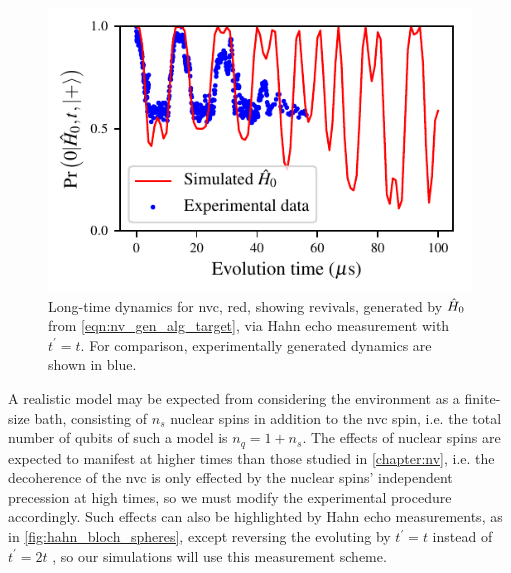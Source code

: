 \begin{figure}
    \begin{center}
        \includegraphics{experimental_study/figures/nv_revival_raw_data.pdf}
    \end{center}
    \caption[Long-time dynamics for nitrogen-vacancy centres]{
        Long-time dynamics for \acrlong{nvc}, red, showing revivals, 
            generated by $\hat{H}_0$ from \cref{eqn:nv_gen_alg_target}, via Hahn echo measurement with $t^{\prime} = t$.
        For comparison, experimentally generated dynamics are shown in blue. 
    }
    \label{fig:nv_revival_raw}
\end{figure}
A realistic model may be expected from considering the environment as a finite-size bath, 
    consisting of $n_s$ nuclear spins in addition to the \gls{nvc} spin, 
    i.e. the total number of qubits of such a model is $n_q = 1 + n_s$.   
The effects of nuclear spins are expected to manifest at higher times than those studied in \cref{chapter:nv}, 
    i.e. the decoherence of the \gls{nvc} is only effected by the nuclear spins' independent precession at high times, 
    so we must modify the experimental procedure accordingly.
Such effects can also be highlighted by Hahn echo measurements, 
    as in \cref{fig:hahn_bloch_spheres}, 
    except reversing the evoluting by $t^{\prime} = t$ instead of $t^{\prime} = 2t$
    \cite{breuer2002theory, childress2006coherent}, so our simulations will use this measurement scheme. 
\par 

